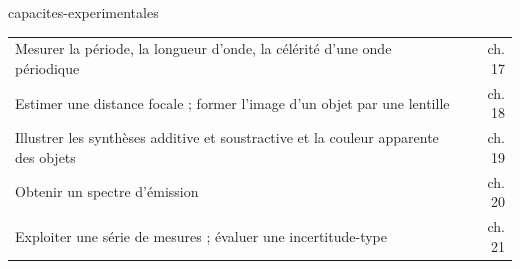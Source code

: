 \begin{blocEdition}{capacites-experimentales}
\begin{tabularx}{\linewidth}{@{}Yr@{}}
Mesurer la période, la longueur d'onde, la célérité d'une onde périodique & ch. 17 \\
Estimer une distance focale ; former l'image d'un objet par une lentille & ch. 18 \\
Illustrer les synthèses additive et soustractive et la couleur apparente des objets & ch. 19 \\
Obtenir un spectre d'émission & ch. 20 \\
Exploiter une série de mesures ; évaluer une incertitude-type & ch. 21 \\\bottomrule
\end{tabularx}
\end{blocEdition}

